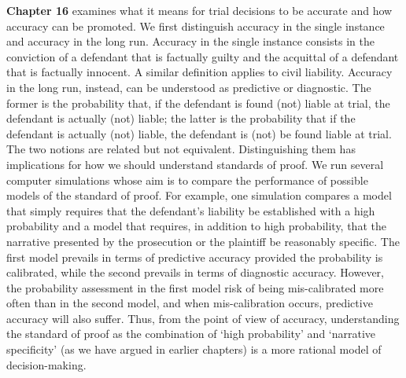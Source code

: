 \documentclass[
  10pt,
  dvipsnames,enabledeprecatedfontcommands]{scrartcl}
\begin{document}
\textbf{Chapter 16} examines what it means for trial decisions to be
accurate and how accuracy can be promoted. We first distinguish accuracy
in the single instance and accuracy in the long run. Accuracy in the
single instance consists in the conviction of a defendant that is
factually guilty and the acquittal of a defendant that is factually
innocent. A similar definition applies to civil liability. Accuracy in
the long run, instead, can be understood as predictive or diagnostic.
The former is the probability that, if the defendant is found (not)
liable at trial, the defendant is actually (not) liable; the latter is
the probability that if the defendant is actually (not) liable, the
defendant is (not) be found liable at trial. The two notions are related
but not equivalent. Distinguishing them has implications for how we
should understand standards of proof. We run several computer
simulations whose aim is to compare the performance of possible models
of the standard of proof. For example, one simulation compares a model
that simply requires that the defendant's liability be established with
a high probability and a model that requires, in addition to high
probability, that the narrative presented by the prosecution or the
plaintiff be reasonably specific. The first model prevails in terms of
predictive accuracy provided the probability is calibrated, while the
second prevails in terms of diagnostic accuracy. However, the
probability assessment in the first model risk of being mis-calibrated
more often than in the second model, and when mis-calibration occurs,
predictive accuracy will also suffer. Thus, from the point of view of
accuracy, understanding the standard of proof as the combination of
`high probability' and `narrative specificity' (as we have argued in
earlier chapters) is a more rational model of decision-making.
\end{document}
